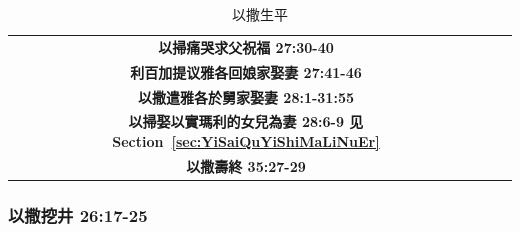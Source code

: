 \begin{table}[H]
\begin{threeparttable}
\begin{tabular}{c c c}
\multicolumn{1}{L{\dimexpr0.5\linewidth-1\tabcolsep\relax}}{\bfseries 以掃痛哭求父祝福 27:30-40}  
& \multicolumn{1}{L{\dimexpr0.2\linewidth-1\tabcolsep\relax}}{\bfseries }
& \multicolumn{1}{L{\dimexpr0.1\linewidth-1\tabcolsep\relax}}{\bfseries }\\ 

\multicolumn{1}{L{\dimexpr0.5\linewidth-1\tabcolsep\relax}}{\bfseries 利百加提议雅各回娘家娶妻 27:41-46}  
& \multicolumn{1}{L{\dimexpr0.2\linewidth-1\tabcolsep\relax}}{\bfseries }
& \multicolumn{1}{L{\dimexpr0.1\linewidth-1\tabcolsep\relax}}{\bfseries }\\ 

\multicolumn{1}{L{\dimexpr0.5\linewidth-1\tabcolsep\relax}}{\bfseries 以撒遣雅各於舅家娶妻 28:1-31:55}  
& \multicolumn{1}{L{\dimexpr0.2\linewidth-1\tabcolsep\relax}}{\bfseries }
& \multicolumn{1}{L{\dimexpr0.1\linewidth-1\tabcolsep\relax}}{\bfseries }\\ 

\multicolumn{1}{L{\dimexpr0.5\linewidth-1\tabcolsep\relax}}{\bfseries 以掃娶以實瑪利的女兒為妻 28:6-9 见Section~\ref{sec:YiSaiQuYiShiMaLiNuEr}}  
& \multicolumn{1}{L{\dimexpr0.2\linewidth-1\tabcolsep\relax}}{\bfseries }
& \multicolumn{1}{L{\dimexpr0.1\linewidth-1\tabcolsep\relax}}{\bfseries }\\ 

\multicolumn{1}{L{\dimexpr0.5\linewidth-1\tabcolsep\relax}}{\bfseries 以撒壽終 35:27-29}  
& \multicolumn{1}{L{\dimexpr0.2\linewidth-1\tabcolsep\relax}}{\bfseries }
& \multicolumn{1}{L{\dimexpr0.1\linewidth-1\tabcolsep\relax}}{\bfseries }\\ \hline

\end{tabular}
\caption{以撒生平}
\label{table:YiSaShengPing}
\end{threeparttable}
\end{table}


\subsubsection{以撒挖井 26:17-25 }

